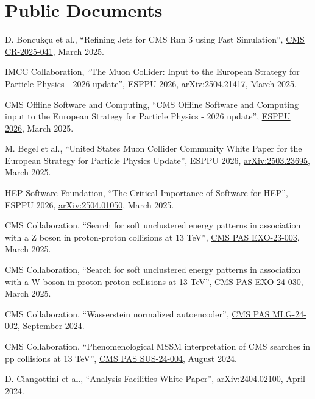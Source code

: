 \section{Public Documents}
\begin{description}[leftmargin=12pt,font=\normalfont,labelsep=0em]
\item D. Boncuk\c{c}u et al., ``Refining Jets for CMS Run 3 using Fast Simulation'', \href{https://cds.cern.ch/record/2926460}{CMS CR-2025-041}, March 2025.
\item IMCC Collaboration, ``The Muon Collider: Input to the European Strategy for Particle Physics - 2026 update'', ESPPU 2026, \href{https://arxiv.org/abs/2504.21417}{arXiv:2504.21417}, March 2025. %
\item CMS Offline Software and Computing, ``CMS Offline Software and Computing input to the European Strategy for Particle Physics - 2026 update'', \href{https://indico.cern.ch/event/1439855/contributions/6461523/}{ESPPU 2026}, March 2025.
\item M. Begel et al., ``United States Muon Collider Community White Paper for the European Strategy for Particle Physics Update'', ESPPU 2026, \href{https://arxiv.org/abs/2503.23695}{arXiv:2503.23695}, March 2025. %
\item HEP Software Foundation, ``The Critical Importance of Software for HEP'', ESPPU 2026, \href{https://arxiv.org/abs/2504.01050}{arXiv:2504.01050}, March 2025. %
\item CMS Collaboration, ``Search for soft unclustered energy patterns in association with a Z boson in proton-proton collisions at 13 TeV'', \href{https://cds.cern.ch/record/2928077}{CMS PAS EXO-23-003}, March 2025. %
\item CMS Collaboration, ``Search for soft unclustered energy patterns in association with a W boson in proton-proton collisions at 13 TeV'', \href{https://cds.cern.ch/record/2927983}{CMS PAS EXO-24-030}, March 2025. %
\item CMS Collaboration, ``Wasserstein normalized autoencoder'', \href{http://cds.cern.ch/record/2911111}{CMS PAS MLG-24-002}, September 2024. %
\item CMS Collaboration, ``Phenomenological MSSM interpretation of CMS searches in pp collisions at 13 TeV'', \href{http://cds.cern.ch/record/2906621}{CMS PAS SUS-24-004}, August 2024. %
\item D. Ciangottini et al., ``Analysis Facilities White Paper'', \href{https://arxiv.org/abs/2404.02100}{arXiv:2404.02100}, April 2024. %

\end{description}
